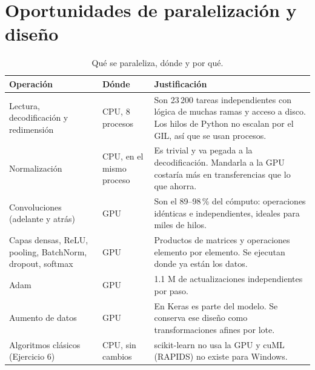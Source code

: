 \documentclass[11pt,letterpaper]{article}
\begin{document}
\section{Oportunidades de paralelización y diseño}

\begin{table}[H]\centering\small
\caption{Qué se paraleliza, dónde y por qué.}
\label{tab:oportunidades}
\begin{tabular}{p{3.6cm}p{2.6cm}p{9.2cm}}
\toprule
Operación & Dónde & Justificación \\
\midrule
Lectura, decodificación y redimensión & CPU, 8 procesos & Son 23\,200 tareas independientes con lógica de muchas ramas y acceso a disco. Los hilos de Python no escalan por el GIL, así que se usan procesos. \\
Normalización & CPU, en el mismo proceso & Es trivial y va pegada a la decodificación. Mandarla a la GPU costaría más en transferencias que lo que ahorra. \\
Convoluciones (adelante y atrás) & GPU & Son el 89--98\,\% del cómputo: operaciones idénticas e independientes, ideales para miles de hilos. \\
Capas densas, ReLU, pooling, BatchNorm, dropout, softmax & GPU & Productos de matrices y operaciones elemento por elemento. Se ejecutan donde ya están los datos. \\
Adam & GPU & 1.1 M de actualizaciones independientes por paso. \\
Aumento de datos & GPU & En Keras es parte del modelo. Se conserva ese diseño como transformaciones afines por lote. \\
Algoritmos clásicos (Ejercicio 6) & CPU, sin cambios & scikit-learn no usa la GPU y cuML (RAPIDS) no existe para Windows. \\
\bottomrule
\end{tabular}
\end{table}
\end{document}
